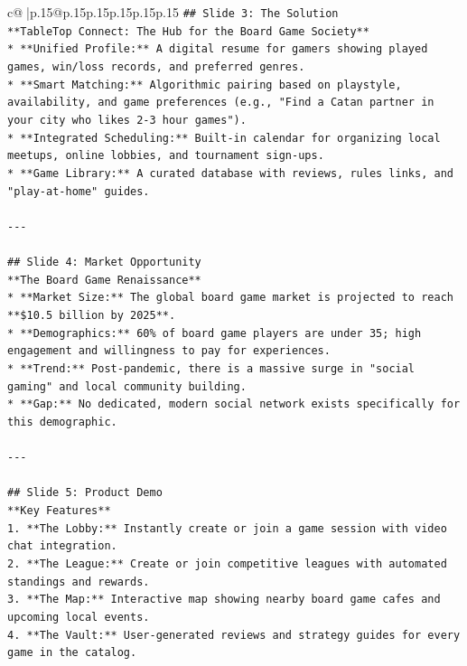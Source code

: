 \documentclass{article}
\begin{document}
{\begin{supertabular}{c@{$\;$}|p{.15\linewidth}@{}p{.15\linewidth}p{.15\linewidth}p{.15\linewidth}p{.15\linewidth}p{.15\linewidth}}
{{{\texttt{\#\# Slide 3: The Solution} \\
\texttt{**TableTop Connect: The Hub for the Board Game Society**} \\
\texttt{*   **Unified Profile:** A digital resume for gamers showing played games, win/loss records, and preferred genres.} \\
\texttt{*   **Smart Matching:** Algorithmic pairing based on playstyle, availability, and game preferences (e.g., "Find a Catan partner in your city who likes 2{-}3 hour games").} \\
\texttt{*   **Integrated Scheduling:** Built{-}in calendar for organizing local meetups, online lobbies, and tournament sign{-}ups.} \\
\texttt{*   **Game Library:** A curated database with reviews, rules links, and "play{-}at{-}home" guides.} \\
\\ 
\texttt{{-}{-}{-}} \\
\\ 
\texttt{\#\# Slide 4: Market Opportunity} \\
\texttt{**The Board Game Renaissance**} \\
\texttt{*   **Market Size:** The global board game market is projected to reach **\$10.5 billion by 2025**.} \\
\texttt{*   **Demographics:** 60\% of board game players are under 35; high engagement and willingness to pay for experiences.} \\
\texttt{*   **Trend:** Post{-}pandemic, there is a massive surge in "social gaming" and local community building.} \\
\texttt{*   **Gap:** No dedicated, modern social network exists specifically for this demographic.} \\
\\ 
\texttt{{-}{-}{-}} \\
\\ 
\texttt{\#\# Slide 5: Product Demo} \\
\texttt{**Key Features**} \\
\texttt{1.  **The Lobby:** Instantly create or join a game session with video chat integration.} \\
\texttt{2.  **The League:** Create or join competitive leagues with automated standings and rewards.} \\
\texttt{3.  **The Map:** Interactive map showing nearby board game cafes and upcoming local events.} \\
\texttt{4.  **The Vault:** User{-}generated reviews and strategy guides for every game in the catalog.} \\
}}}
\end{supertabular}}
\end{document}
